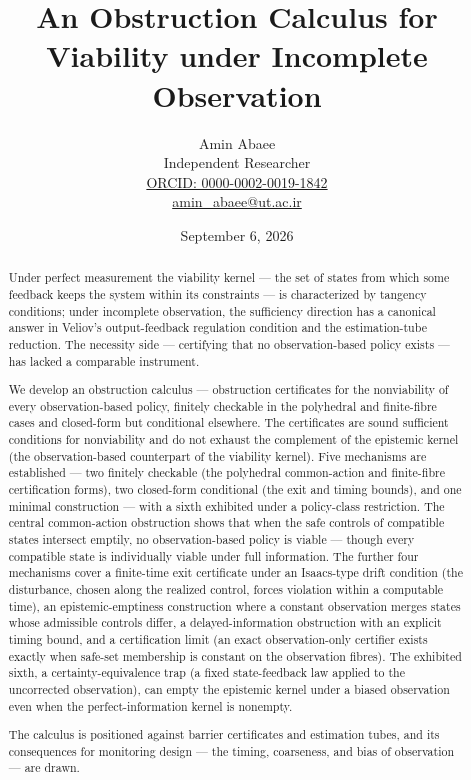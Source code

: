 \documentclass[11pt]{article}
\begin{document}
\title{An Obstruction Calculus for Viability under Incomplete Observation}
\author{Amin Abaee\\[0.35em]
{\small Independent Researcher}\\[0.55em]
{\small\href{https://orcid.org/0000-0002-0019-1842}{ORCID: 0000-0002-0019-1842}}\\[0.3em]
{\small\href{mailto:amin\_abaee@ut.ac.ir}{amin\_abaee@ut.ac.ir}}}
\date{September 6, 2026}
\maketitle

\begin{abstract}


Under perfect measurement the viability kernel --- the set of states
from which some feedback keeps the system within its constraints --- is
characterized by tangency conditions; under incomplete observation, the
sufficiency direction has a canonical answer in Veliov's output-feedback
regulation condition and the estimation-tube reduction. The necessity
side --- certifying that no observation-based policy exists --- has
lacked a comparable instrument.

We develop an obstruction calculus --- obstruction certificates for the
nonviability of every observation-based policy, finitely checkable in
the polyhedral and finite-fibre cases and closed-form but conditional
elsewhere. The certificates are sound sufficient conditions for
nonviability and do not exhaust the complement of the epistemic kernel
(the observation-based counterpart of the viability kernel). Five
mechanisms are established --- two finitely checkable (the polyhedral
common-action and finite-fibre certification forms), two closed-form
conditional (the exit and timing bounds), and one minimal construction
--- with a sixth exhibited under a policy-class restriction. The central
common-action obstruction shows that when the safe controls of
compatible states intersect emptily, no observation-based policy is
viable --- though every compatible state is individually viable under
full information. The further four mechanisms cover a finite-time exit
certificate under an Isaacs-type drift condition (the disturbance,
chosen along the realized control, forces violation within a computable
time), an epistemic-emptiness construction where a constant observation
merges states whose admissible controls differ, a delayed-information
obstruction with an explicit timing bound, and a certification limit (an
exact observation-only certifier exists exactly when safe-set membership
is constant on the observation fibres). The exhibited sixth, a
certainty-equivalence trap (a fixed state-feedback law applied to the
uncorrected observation), can empty the epistemic kernel under a biased
observation even when the perfect-information kernel is nonempty.

The calculus is positioned against barrier certificates and estimation
tubes, and its consequences for monitoring design --- the timing,
coarseness, and bias of observation --- are drawn.

\end{abstract}
\end{document}

